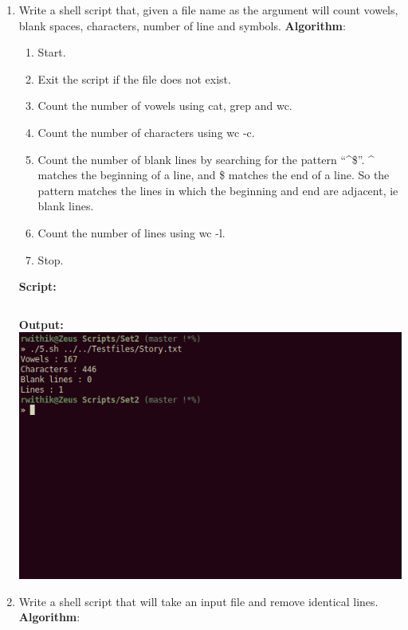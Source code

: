 \documentclass[10pt,a4paper,titlepage]{report}
\begin{document}
\begin{enumerate}
\item Write a shell script that, given a file name as the argument will count vowels, blank spaces, characters, number of line and symbols. \newline
\textbf{Algorithm}:\newline
\begin{enumerate}
	\item Start.
	\item Exit the script if the file does not exist.
	\item Count the number of vowels using {\color{red}cat}, {\color{red}grep} and {\color{red}wc}.
	\item Count the number of characters using {\color{red}wc -c}.
	\item Count the number of blank lines by searching for the pattern ``\^{}\$''. \^{} matches the beginning of a line, and \$ matches the end of a line. So the pattern matches the lines in which the beginning and end are adjacent, ie blank lines.
	\item Count the number of lines using {\color{red}wc -l}.
	\item Stop.
\end{enumerate}
\newline
\textbf{Script:}\newline
\inputminted{bash}{../Scripts/Set2/5.sh}
\newline
\textbf{Output:}\newline
\includegraphics[width=\linewidth]{../Images/Shell2/5.png}
\item Write a shell script that will take an input file and remove identical lines. \newline
\textbf{Algorithm}:\newline

\end{enumerate}
\end{document}
